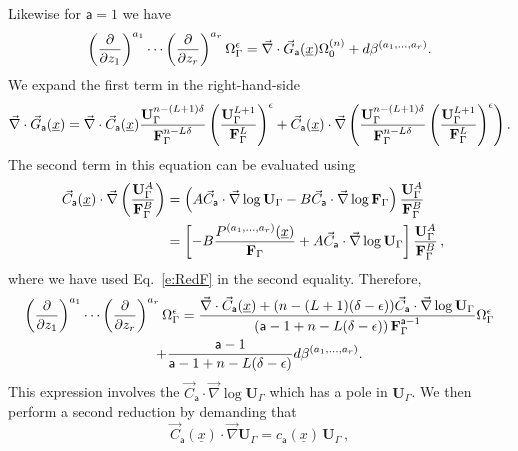 \documentclass[a4paper,12pt]{article}
\numberwithin{equation}{section}
\numberwithin{figure}{section}
\begin{document}
Likewise for $\mathsf{a}=1$ we have
\begin{equation}\label{e:RedG2}
    \left(\partial\over \partial z_1\right)^{a_1}\cdots\left(\partial
  \over\partial z_r\right)^{a_r} \Omega_\Gamma^\epsilon=
\vec\nabla \cdot \vec G_{\mathsf{a}}
     (\underline x)
  \Omega_0^{(n)}+d\beta^{(a_1,\dots,a_r)}.
\end{equation}
We expand the first term in the right-hand-side
\begin{equation}
  \vec\nabla \cdot \vec G_{\mathsf{a}}(\underline x)=  \vec\nabla \cdot \vec C_{\mathsf{a}}(\underline x) {\textbf{U}_\Gamma^{n-(L+1)\delta}\over
  \textbf{F}_\Gamma^{n-L\delta}} \left(\mathbf{U}_\Gamma^{L+1}\over
  \mathbf{F}_\Gamma^L\right)^\epsilon
+
  \vec C_{\mathsf{a}}(\underline x) \cdot\vec\nabla  \left(  {\textbf{U}_\Gamma^{n-(L+1)\delta}\over
  \textbf{F}_\Gamma^{n-L\delta}} \left(\mathbf{U}_\Gamma^{L+1}\over
  \mathbf{F}_\Gamma^L\right)^\epsilon\right) .
\end{equation}
%
The second term in this equation can be evaluated using 
\begin{align}
  \vec C_{\mathsf{a}}(\underline x)\cdot \vec\nabla \left(\mathbf{U}_\Gamma^{A}\over
\mathbf{F}_\Gamma^B\right)&=\left(A \vec
C_{\mathsf{a}}\cdot \vec\nabla \log\mathbf{U}_\Gamma -B \vec
C_{\mathsf{a}}\cdot \vec\nabla \log \mathbf{F}_\Gamma\right) {\mathbf{U}_\Gamma^{A}\over
\mathbf{F}_\Gamma^B} \cr
&=\left[-B{
    P^{(a_1,\dots,a_r)}(\underline x)\over
  \mathbf{F}_\Gamma}   
+
 A \vec
C_{\mathsf{a}}\cdot \vec\nabla \log\mathbf{U}_\Gamma \right] {\mathbf{U}_\Gamma^{A}\over
	\mathbf{F}_\Gamma^B}\,,
\end{align}
where we have used Eq.~\eqref{e:RedF} in the second equality. Therefore, 
\begin{multline}
	\label{e:Pred}
\left(\partial\over \partial z_1\right)^{a_1}\cdots\left(\partial
  \over\partial z_r\right)^{a_r} \Omega_\Gamma^\epsilon={
\vec\nabla \cdot \vec C_{\mathsf{a}}
     (\underline x)
+   (n-(L+1)(\delta-\epsilon)) \vec
    C_{\mathsf{a}}\cdot\vec\nabla\log\mathbf{U}_\Gamma\over (\mathsf{a}-1+n-L(\delta-\epsilon))\,\textbf{F}_\Gamma^{\mathsf{a}-1}}
  \Omega_\Gamma^\epsilon\cr
+{  \mathsf{a}-1 \over \mathsf{a}-1+n-L(\delta-\epsilon)} d\beta^{(a_1,\dots,a_r)}.
\end{multline}
%
This expression involves the $\vec
    C_{\mathsf{a}}\cdot\vec\nabla\log\mathbf{U}_\Gamma$ which has a
    pole in $\mathbf{U}_\Gamma$. We then perform a second reduction by demanding that
    \begin{equation}
      \label{e:RedU}
      \vec
    C_{\mathsf{a}}(\underline x)\cdot\vec\nabla \mathbf{U}_\Gamma =
    c_{\mathsf{a}}(\underline x) \, \mathbf{U}_\Gamma \, ,
    \end{equation}
\end{document}
